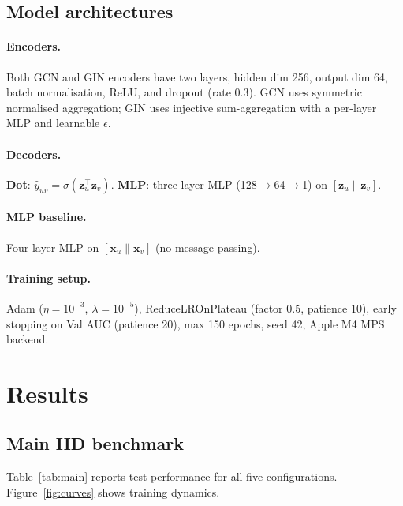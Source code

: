 \documentclass[10pt,twocolumn]{article}
\begin{document}
\subsection{Model architectures}

\paragraph{Encoders.}
Both GCN and GIN encoders have two layers, hidden dim 256, output dim 64,
batch normalisation, ReLU, and dropout (rate 0.3).
GCN uses symmetric normalised aggregation; GIN uses injective
sum-aggregation with a per-layer MLP and learnable $\epsilon$.

\paragraph{Decoders.}
\textbf{Dot}: $\hat{y}_{uv}{=}\sigma(\mathbf{z}_u^\top\mathbf{z}_v)$.
\textbf{MLP}: three-layer MLP (128$\to$64$\to$1) on
$[\mathbf{z}_u\|\mathbf{z}_v]$.

\paragraph{MLP baseline.}
Four-layer MLP on $[\mathbf{x}_u\|\mathbf{x}_v]$ (no message passing).

\paragraph{Training setup.}
Adam ($\eta{=}10^{-3}$, $\lambda{=}10^{-5}$), ReduceLROnPlateau
(factor 0.5, patience 10), early stopping on Val AUC (patience 20),
max 150 epochs, seed 42, Apple M4 MPS backend.

\section{Results}

\subsection{Main IID benchmark}

Table~\ref{tab:main} reports test performance for all five configurations.
Figure~\ref{fig:curves} shows training dynamics.
\end{document}
